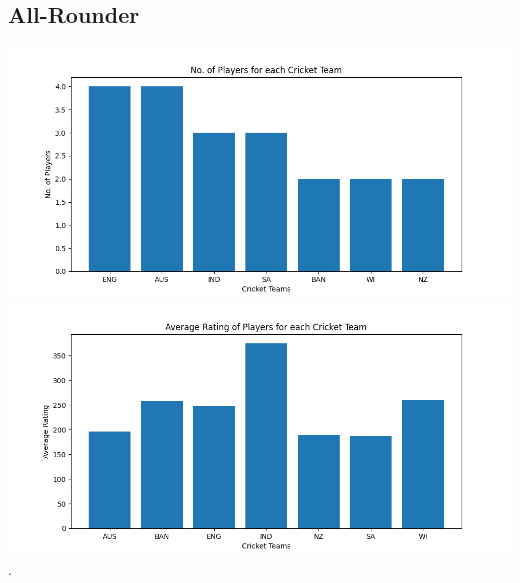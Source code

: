\documentclass{article}
\begin{document}
\begin{normalsize}
            \subsection{All-Rounder}\label{subsec:all-rounder3}
                \includegraphics[scale=0.75]{test_all-rounder_3-10-2023-1}
                \includegraphics[scale=0.75]{test_all-rounder_3-10-2023-2}
        .
\end{normalsize}
\end{document}
